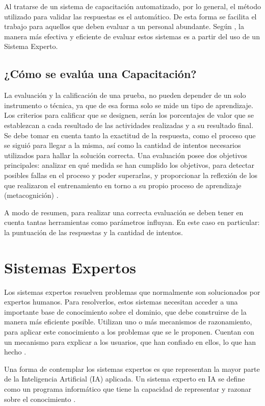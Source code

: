 Al tratarse de un sistema de capacitación automatizado, por lo general, el método utilizado para validar las respuestas es el automático. De esta forma se facilita el trabajo para aquellos que deben evaluar a un personal abundante. Según \cite{AltyJL1984}, la manera más efectiva y eficiente de evaluar estos sistemas es a partir del uso de un Sistema Experto.

\subsection{¿Cómo se evalúa una Capacitación?}
La evaluación y la calificación de una prueba, no pueden depender de un solo instrumento o técnica, ya que de esa forma solo se mide un tipo de aprendizaje. Los criterios para calificar que se designen, serán los porcentajes de valor que se establezcan a cada resultado de las actividades realizadas y a su resultado final. Se debe tomar en cuenta tanto la exactitud de la respuesta, como el proceso que se siguió para llegar a la misma, así como la cantidad de intentos necesarios utilizados para hallar la solución correcta.
Una evaluación posee dos objetivos principales: analizar en qué medida se han cumplido los objetivos, para detectar posibles fallas en el proceso y poder superarlas, y proporcionar la reflexión de los que realizaron el entrenamiento en torno a su propio proceso de aprendizaje (metacognición) \cite{RonaldL.Jacobs2012}.

A modo de resumen, para realizar una correcta evaluación se deben tener en cuenta tantas herramientas como parámetros influyan. En este caso en particular: la puntuación de las respuestas y la cantidad de intentos.


\section{Sistemas Expertos}
Los sistemas expertos resuelven problemas que normalmente son solucionados por expertos humanos. Para resolverlos, estos sistemas necesitan acceder a una importante base de conocimiento sobre el dominio, que debe construirse de la manera más eficiente posible.
Utilizan uno o más mecanismos de razonamiento, para aplicar este conocimiento a los problemas que se le proponen. Cuentan con un mecanismo para explicar a los usuarios, que han confiado en ellos, lo que han hecho \cite{AltyJL1984}.

Una forma de contemplar los sistemas expertos es que representan la mayor parte de la Inteligencia Artificial (IA) aplicada. Un sistema experto en IA se define como un programa informático que tiene la capacidad de representar y razonar sobre el conocimiento \cite{Rasheed2021}.


